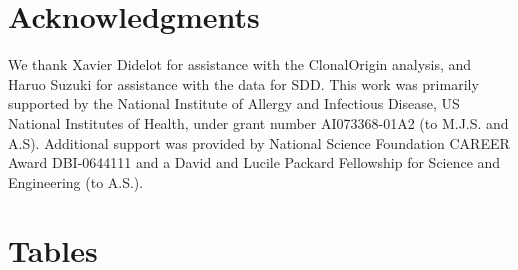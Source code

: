 \documentclass[12pt]{article}
\begin{document}
\section*{Acknowledgments}

We thank Xavier Didelot for assistance with the ClonalOrigin analysis, and
Haruo Suzuki for assistance with the data for SDD. This work was primarily
supported by the National Institute of Allergy and Infectious Disease, US
National Institutes of Health, under grant number AI073368-01A2 (to
M.J.S. and A.S).  Additional support was provided by National Science
Foundation CAREER Award DBI-0644111 and a David and Lucile Packard
Fellowship for Science and Engineering (to A.S.).



\renewcommand*{\refname}{Literature Cited}


\clearpage{}


\section*{Tables}
\end{document}
